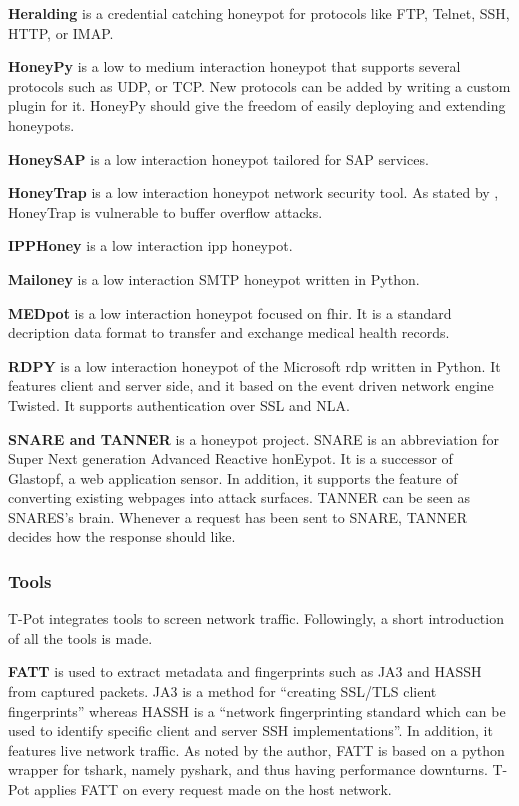 \textbf{Heralding} \cite{heralding2021} is a credential catching honeypot for protocols like FTP, Telnet, SSH, HTTP, or IMAP.

\textbf{HoneyPy} \cite{honeysap2021} is a low to medium interaction honeypot that supports several protocols such as UDP, or TCP.
New protocols can be added by writing a custom plugin for it.
HoneyPy should give the freedom of easily deploying and extending honeypots.

\textbf{HoneySAP} \cite{honeysap2021} is a low interaction honeypot tailored for SAP services.

\textbf{HoneyTrap} \cite{honeytrap2021} is a low interaction honeypot network security tool.
As stated by \citet*{honeytrap2021}, HoneyTrap is vulnerable to buffer overflow attacks.

\textbf{IPPHoney} \cite{ipphoney2021} is a low interaction \ac{ipp} honeypot.

\textbf{Mailoney} is a low interaction SMTP honeypot written in Python.

\textbf{MEDpot} \cite{medpot2021} is a low interaction honeypot focused on \ac{fhir}.
It is a standard decription data format to transfer and exchange medical health records.

\textbf{RDPY} \cite{rdpy2021} is a low interaction honeypot of the Microsoft \ac{rdp} written in Python.
It features client and server side, and it based on the event driven network engine Twisted.
It supports authentication over SSL and NLA.

\textbf{SNARE and TANNER} \cite{snare2021, tanner2021} is a honeypot project.
SNARE is an abbreviation for Super Next generation Advanced Reactive honEypot.
It is a successor of Glastopf, a web application sensor.
In addition, it supports the feature of converting existing webpages into attack surfaces.
TANNER \cite{tanner2021} can be seen as SNARES's brain.
Whenever a request has been sent to SNARE, TANNER decides how the response should like.

\subsubsection{Tools}

T-Pot integrates tools to screen network traffic. Followingly, a short introduction of all the tools is made.

\textbf{FATT} \cite{fatt2021} is used to extract metadata and fingerprints such as JA3 \cite{ja32021} and HASSH \cite{hassh2021} from captured packets.
JA3 is a method for \enquote{creating SSL/TLS client fingerprints} whereas HASSH is a \enquote{network fingerprinting standard which can be used to identify specific client and server SSH implementations}.
In addition, it features live network traffic.
As noted by the author, FATT is based on a python wrapper for tshark, namely pyshark, and thus having performance downturns.
T-Pot applies FATT on every request made on the host network. 


